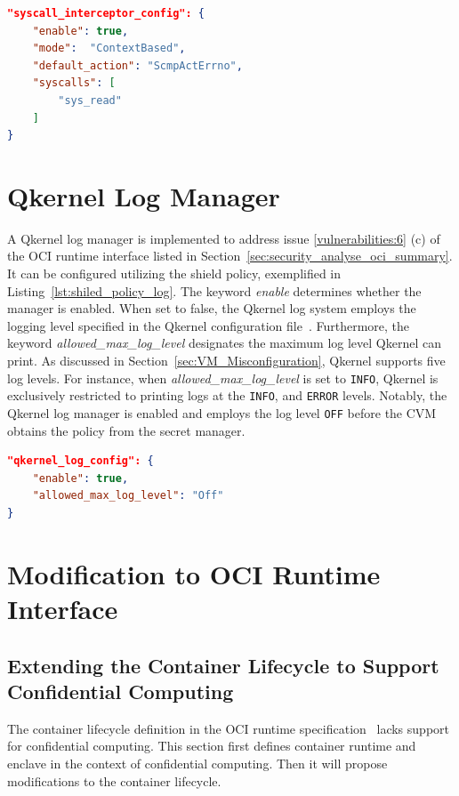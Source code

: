 \begin{lstlisting}[language=json, caption= System call interceptor's configuration in the shield policy, label={lst:shiled_policy_interceptor}]
"syscall_interceptor_config": {
    "enable": true,
    "mode":  "ContextBased",
    "default_action": "ScmpActErrno",
    "syscalls": [
        "sys_read"
    ]
}
\end{lstlisting}

\section{Qkernel Log Manager}
\label{sec:Qkernel_logger}
A Qkernel log manager is implemented to address issue \ref{vulnerabilities:6} (c) of the OCI runtime interface listed in Section~\ref{sec:security_analyse_oci_summary}. It can be configured utilizing the shield policy, exemplified in Listing~\ref{lst:shiled_policy_log}. The keyword \emph{enable} determines whether the manager is enabled. When set to false, the Qkernel log system employs the logging level specified in 
the Qkernel configuration file~\cite*{quark_conf_file}. Furthermore, the keyword \emph{allowed\_max\_log\_level} designates the maximum log level Qkernel can print. As discussed in Section~\ref{sec:VM_Misconfiguration}, Qkernel supports five log levels. For instance, when \emph{allowed\_max\_log\_level} is set to \texttt{INFO}, Qkernel is exclusively 
restricted to printing logs at the \texttt{INFO}, and \texttt{ERROR} levels. Notably, the Qkernel log manager is enabled and employs the log level \texttt{OFF} before the \acrshort{CVM} obtains the policy from the secret manager.

\begin{lstlisting}[language=json, caption= Qkernel log manager's configuration in the shield policy, label={lst:shiled_policy_log}]
"qkernel_log_config": {
    "enable": true,
    "allowed_max_log_level": "Off"
}
\end{lstlisting}
    

\section{Modification to OCI Runtime Interface}
\label{sec:Modification_OCI}

\subsection{Extending the Container Lifecycle to Support Confidential Computing}
The container lifecycle definition in the OCI runtime specification~\cite*{oci-runtime-spec} lacks support for confidential computing. This section first defines container runtime and enclave in the context of confidential computing. Then it will propose modifications to the container 
lifecycle.


